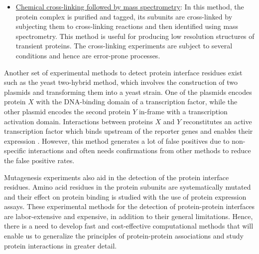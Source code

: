 \begin{itemize}
\item \underline{Chemical cross-linking followed by mass spectrometry}: In this method, the protein complex is purified and tagged, its subunits are cross-linked by subjecting them to cross-linking reactions and then identified using mass spectrometry. This method is useful for producing low resolution structures of transient proteins. The cross-linking experiments are subject to several conditions and hence are error-prone processes. 
\end{itemize}

\par
Another set of experimental methods to detect protein interface residues exist such as the yeast two-hybrid method, which involves the construction of two plasmids and transforming them into a yeast strain. One of the plasmids encodes protein $X$ with the DNA-binding domain of a transcription factor, while the other plasmid encodes the second protein $Y$ in-frame with a transcription activation domain. Interactions between proteins $X$ and $Y$ reconstitutes an active transcription factor which binds upstream of the reporter genes and enables their expression \citep{Causier2002}. However, this method generates a lot of false positives due to non-specific interactions and often needs confirmations from other methods to reduce the false positive rates.
\par
Mutagenesis experiments also aid in the detection of the protein interface residues. Amino acid residues in the protein subunits are systematically mutated and their effect on protein binding is studied with the use of protein expression assays. These experimental methods for the detection of protein-protein interfaces are labor-extensive and expensive, in addition to their general limitations. Hence, there is a need to develop fast and cost-effective computational methods that will enable us to generalize the principles of protein-protein associations and study protein interactions in greater detail.

